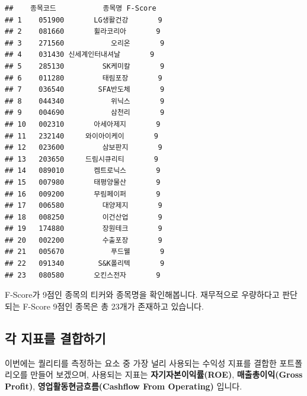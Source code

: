 \documentclass[12pt,]{book}
\newenvironment{Shaded}{\begin{snugshade}}{\end{snugshade}}
\newcommand{\DataTypeTok}[1]{\textcolor[rgb]{0.13,0.29,0.53}{#1}}
\newcommand{\DecValTok}[1]{\textcolor[rgb]{0.00,0.00,0.81}{#1}}
\newcommand{\KeywordTok}[1]{\textcolor[rgb]{0.13,0.29,0.53}{\textbf{#1}}}
\newcommand{\NormalTok}[1]{#1}
\newcommand{\OperatorTok}[1]{\textcolor[rgb]{0.81,0.36,0.00}{\textbf{#1}}}
\newcommand{\StringTok}[1]{\textcolor[rgb]{0.31,0.60,0.02}{#1}}
\begin{document}
\begin{Shaded}
\end{Shaded}

\begin{verbatim}
##    종목코드           종목명 F-Score
## 1    051900       LG생활건강       9
## 2    081660       휠라코리아       9
## 3    271560           오리온       9
## 4    031430 신세계인터내셔날       9
## 5    285130         SK케미칼       9
## 6    011280         태림포장       9
## 7    036540        SFA반도체       9
## 8    044340           위닉스       9
## 9    004690           삼천리       9
## 10   002310       아세아제지       9
## 11   232140     와이아이케이       9
## 12   023600         삼보판지       9
## 13   203650     드림시큐리티       9
## 14   089010       켐트로닉스       9
## 15   007980       태평양물산       9
## 16   009200       무림페이퍼       9
## 17   006580         대양제지       9
## 18   008250         이건산업       9
## 19   174880         장원테크       9
## 20   002200         수출포장       9
## 21   005670           푸드웰       9
## 22   091340        S&K폴리텍       9
## 23   080580       오킨스전자       9
\end{verbatim}

F-Score가 9점인 종목의 티커와 종목명을 확인해봅니다. 재무적으로 우량하다고 판단되는 F-Score 9점인 종목은 총 23개가 존재하고 있습니다.

\hypertarget{section-58}{%
\subsection{각 지표를 결합하기}\label{section-58}}

이번에는 퀄리티를 측정하는 요소 중 가장 널리 사용되는 수익성 지표를 결합한 포트폴리오를 만들어 보겠으며, 사용되는 지표는 \textbf{자기자본이익률(ROE)}, \textbf{매출총이익(Gross Profit)}, \textbf{영업활동현금흐름(Cashflow From Operating)} 입니다.
\end{document}

